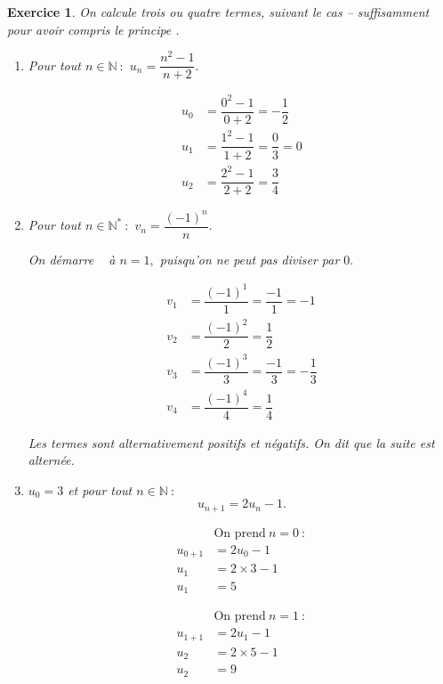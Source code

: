 \documentclass[10pt]{article}
\newtheorem{exo}{Exercice}
\begin{document}
\begin{exo}

On calcule trois ou quatre termes, suivant le cas -- suffisamment pour \og avoir compris le principe \fg.

\begin{enumerate}
\item Pour tout $n\in\mathbb{N}~:$ $u_n=\dfrac{n^2-1}{n+2}.$

\begin{align*}
u_0&=\dfrac{0^2-1}{0+2}=-\dfrac{1}{2}\\
u_1&=\dfrac{1^2-1}{1+2}=\dfrac{0}{3}=0\\
u_2&=\dfrac{2^2-1}{2+2}=\dfrac{3}{4}
\end{align*}

\item Pour tout $n\in\mathbb{N}^*~:$ $v_n=\dfrac{(-1)^n}{n}.$

\danger On \og démarre \fg~{} à $n=1,$ puisqu'on ne peut pas diviser par $0.$

\begin{align*}
v_1&=\dfrac{(-1)^1}{1}=\dfrac{-1}{1}=-1\\
v_2&=\dfrac{(-1)^2}{2}=\dfrac{1}{2}\\
v_3&=\dfrac{(-1)^3}{3}=\dfrac{-1}{3}=-\dfrac{1}{3}\\
v_4&=\dfrac{(-1)^4}{4}=\dfrac{1}{4}
\end{align*}

Les termes sont alternativement positifs et négatifs. On dit que la suite est alternée.
\item $u_0=3$ et pour tout $n\in\mathbb{N}~:$
\[u_{n+1}=2u_n-1.\]


\medskip

\setlength{\columnseprule}{1pt}

\begin{multicols}{4}

\begin{align*}
&\text{On prend}~n=0~:\\
u_{0+1}&=2u_0-1\\
u_{1}&=2\times 3-1\\
u_1&=5
\end{align*}

\begin{align*} 
&\text{On prend}~n=1~:\\
u_{1+1}&=2u_1-1\\
u_{2}&=2\times 5-1\\
u_2&=9
\end{align*}


\end{multicols}
\end{enumerate}
\end{exo}
\end{document}
